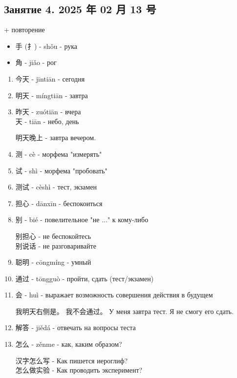 \newpage
\subsection{Занятие 4. 2025 年 02 月 13 号}
\begin{newgraphems} + повторение\hfill
	\begin{itemize}
		\item 手 (扌) - shǒu - рука
		\item 角 - jiǎo - рог
	\end{itemize}
\end{newgraphems}
\begin{newwords}\hfill
	\begin{enumerate}
		\item 今天 - jīntiān - сегодня
		\item 明天 - míngtiān - завтра
		\item 昨天 - zuótiān - вчера\\
		天 - tiān - небо, день
		\begin{example}
			明天晚上 - завтра вечером.
		\end{example}
		\item 测 - cè - морфема "измерять"
		\item 试 - shì - морфема "пробовать"
		\item 测试 - cèshì - тест, экзамен
		\item 担心 - dānxīn - беспокоиться
		\item 别 - bié - повелительное "не ..." к кому-либо
		\begin{example}\hfill\break
			别担心 - не беспокойтесь\\
			别说话 - не разговаривайте
		\end{example}
		\item 聪明 - cōngmíng - умный
		\item 通过 - tōngguò - пройти, сдать (тест/экзамен)
		\item 会 - huì - выражает возможность совершения действия в будущем
		\begin{example}\hfill\break
			我明天右侧是。 我不会通过。 У меня завтра тест. Я не смогу его сдать.
		\end{example}
		\item 解答 - jiědá - отвечать на вопросы теста
		\item 怎么 - zěnme - как, каким образом?
		\begin{example}\hfill\break
			汉字怎么写 - Как пишется иероглиф?\\
			怎么做实验 - Как проводить эксперимент?

\end{example}
\end{enumerate}
\end{newwords}
